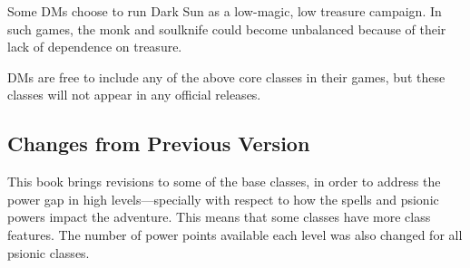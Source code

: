 Some DMs choose to run {\tableheader Dark Sun} as a low-magic, low treasure campaign. In such games, the monk and soulknife could become unbalanced because of their lack of dependence on treasure.

DMs are free to include any of the above core classes in their games, but these classes will not appear in any official releases.

\subsection{Changes from Previous Version}
This book brings revisions to some of the base classes, in order to address the power gap in high levels---specially with respect to how the spells and psionic powers impact the adventure. This means that some classes have more class features. The number of power points available each level was also changed for all psionic classes.






